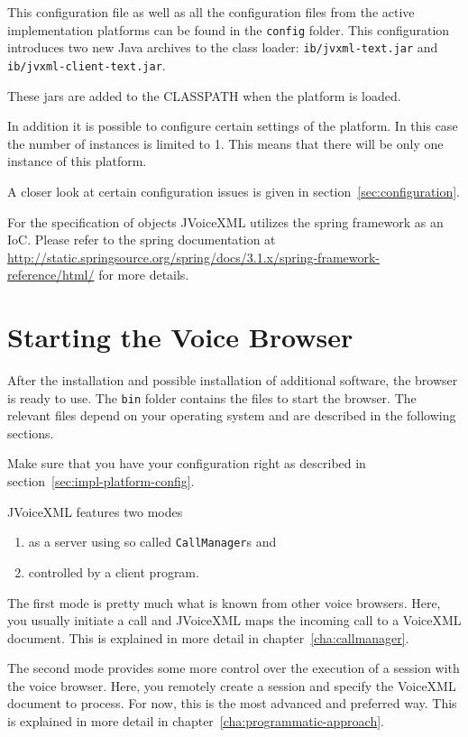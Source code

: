 \documentclass[11pt,a4paper]{book}
\begin{document}
This configuration file as well as all the configuration files from the
active implementation platforms can be found in the \lstinline{config} folder.
This configuration introduces two new Java archives to the class loader:
\lstinline{ib/jvxml-text.jar} and \lstinline{ib/jvxml-client-text.jar}.

These jars are added to the CLASSPATH when the platform is loaded.

In addition it is possible to configure certain settings of the platform. In
this case the number of instances is limited to 1. This means that there will be
only one instance of this platform.

A closer look at certain configuration issues is given in
section~\ref{sec:configuration}. 

For the specification of objects JVoiceXML utilizes the spring framework as an
IoC. Please refer to the spring documentation at
\url{http://static.springsource.org/spring/docs/3.1.x/spring-framework-reference/html/}
for more details.

\section{Starting the Voice Browser}

After the installation and possible installation of additional software, the
browser is ready to use. The \texttt{bin} folder contains the files to start
the browser. The relevant files depend on your operating system and are
described in the following sections.

Make sure that you have your configuration right as described in
section~\ref{sec:impl-platform-config}.

JVoiceXML features two modes
\begin{enumerate}
  \item as a server using so called \lstinline{CallManager}s and
  \item controlled by a client program.
\end{enumerate}

The first mode is pretty much what is known from other voice browsers. Here,
you usually initiate a call and JVoiceXML maps the incoming call to a VoiceXML
document. This is explained in more detail in chapter~\ref{cha:callmanager}.

The second mode provides some more control over the execution of a session with
the voice browser. Here, you remotely create a session and specify the VoiceXML
document to process. For now, this is the most advanced and preferred way.
This is explained in more detail in chapter~\ref{cha:programmatic-approach}.
\end{document}
